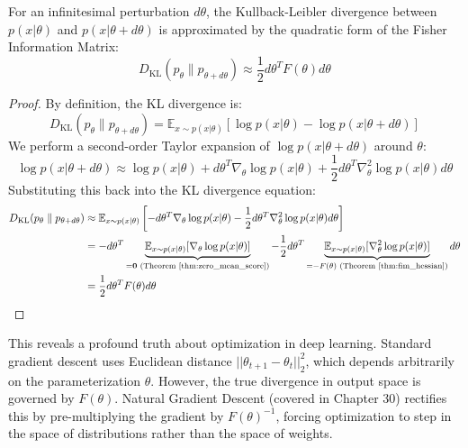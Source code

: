 \begin{theorem}
\label{thm:fim_kl}
For an infinitesimal perturbation $d\theta$, the Kullback-Leibler divergence between $p(x|\theta)$ and $p(x|\theta + d\theta)$ is approximated by the quadratic form of the Fisher Information Matrix:
\begin{equation}
    D_{\text{KL}}(p_{\theta} \parallel p_{\theta + d\theta}) \approx \frac{1}{2} d\theta^T F(\theta) d\theta
\end{equation}
\end{theorem}
\begin{proof}
By definition, the KL divergence is:
\begin{equation*}
    D_{\text{KL}}(p_{\theta} \parallel p_{\theta + d\theta}) = \mathbb{E}_{x \sim p(x|\theta)} \left[ \log p(x|\theta) - \log p(x|\theta + d\theta) \right]
\end{equation*}
We perform a second-order Taylor expansion of $\log p(x|\theta + d\theta)$ around $\theta$:
\begin{equation*}
    \log p(x|\theta + d\theta) \approx \log p(x|\theta) + d\theta^T \nabla_\theta \log p(x|\theta) + \frac{1}{2} d\theta^T \nabla_\theta^2 \log p(x|\theta) d\theta
\end{equation*}
Substituting this back into the KL divergence equation:
\begin{align*}
    D_{\text{KL}}(p_{\theta} \parallel p_{\theta + d\theta}) &\approx \mathbb{E}_{x \sim p(x|\theta)} \left[ - d\theta^T \nabla_\theta \log p(x|\theta) - \frac{1}{2} d\theta^T \nabla_\theta^2 \log p(x|\theta) d\theta \right] \\
    &= - d\theta^T \underbrace{\mathbb{E}_{x \sim p(x|\theta)} [ \nabla_\theta \log p(x|\theta) ]}_{= \mathbf{0} \text{ (Theorem~\ref{thm:zero_mean_score})}} - \frac{1}{2} d\theta^T \underbrace{\mathbb{E}_{x \sim p(x|\theta)} [ \nabla_\theta^2 \log p(x|\theta) ]}_{= -F(\theta) \text{ (Theorem~\ref{thm:fim_hessian})}} d\theta \\
    &= \frac{1}{2} d\theta^T F(\theta) d\theta
\end{align*}
\end{proof}

This reveals a profound truth about optimization in deep learning. Standard gradient descent uses Euclidean distance $||\theta_{t+1} - \theta_t||^2_2$, which depends arbitrarily on the parameterization $\theta$. However, the true divergence in output space is governed by $F(\theta)$. Natural Gradient Descent (covered in Chapter 30) rectifies this by pre-multiplying the gradient by $F(\theta)^{-1}$, forcing optimization to step in the space of distributions rather than the space of weights.

